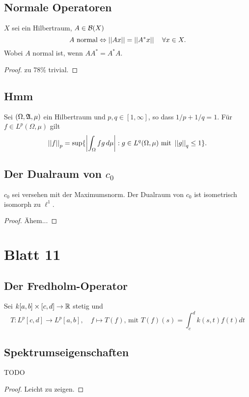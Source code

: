 \documentclass[FunkAnaskriptSS2017.tex]{subfiles}
\begin{document}
\subsection{ Normale Operatoren}
\label{B10.3}
	$X$ sei ein Hilbertraum, $A\in \mathcal{B}(X)$
	$$A \text{ normal} \Leftrightarrow \left\lvert \left\lvert  Ax  \right\rvert \right\rvert = \left\lvert \left\lvert  A^* x \right\rvert \right\rvert \quad \forall x\in X.$$
	Wobei $A$ normal ist, wenn $AA^* = A^* A$.
	
	\begin{proof}
	zu 78\% trivial.
	\end{proof}


\subsection{ Hmm}
\label{B10.4}
	Sei $(\Omega, \mathfrak{A}, \mu )$ ein Hilbertraum und $p,q \in [1,\infty]$, so dass $1/p + 1/q = 1$. Für $f\in L^p(\Omega , \mu )$ gilt
	$$ \left\lvert \left\lvert f \right\rvert \right\rvert_p = \sup \{ \left\lvert  \int_{\Omega } fg\,d\mu  \right\rvert : g \in L^q(\Omega, \mu ) \text{ mit } \left\lvert \left\lvert g \right\rvert \right\rvert_q \leq 1 \}.$$
	
	
\subsection{ Der Dualraum von $c_0$}
\label{B10.5}
	$c_0$ sei versehen mit der Maximumsnorm. Der Dualraum von $c_0$ ist isometrisch isomorph zu $\ell^1$.
	
	\begin{proof}
	Ähem...
	\end{proof}


\newpage
\section{ Blatt 11}

\subsection{ Der Fredholm-Operator}
\label{B11.1}
	Sei $k [a,b] \times [c,d] \to\mathbb{R}$ stetig und
	$$ T : L^p[c,d] \to L^p[a,b], \quad f \mapsto T(f) \text{, mit } T(f)(s)= \int^d_c k(s,t) f(t) dt$$


\subsection{ Spektrumseigenschaften}
\label{B11.2}
TODO
	\begin{proof}
	Leicht zu zeigen.
	\end{proof}
\end{document}
